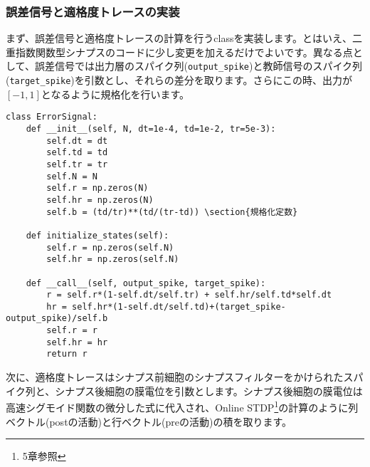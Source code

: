 \subsubsection{誤差信号と適格度トレースの実装}
まず、誤差信号と適格度トレースの計算を行うclassを実装します。とはいえ、二重指数関数型シナプスのコードに少し変更を加えるだけでよいです。異なる点として、誤差信号では出力層のスパイク列(\texttt{output\_spike})と教師信号のスパイク列(\texttt{target\_spike})を引数とし、それらの差分を取ります。さらにこの時、出力が$[-1, 1]$となるように規格化を行います。
\begin{verbatim}
class ErrorSignal:
    def __init__(self, N, dt=1e-4, td=1e-2, tr=5e-3):
        self.dt = dt
        self.td = td
        self.tr = tr
        self.N = N
        self.r = np.zeros(N)
        self.hr = np.zeros(N)
        self.b = (td/tr)**(td/(tr-td)) \section{規格化定数}
    
    def initialize_states(self):
        self.r = np.zeros(self.N)
        self.hr = np.zeros(self.N)    

    def __call__(self, output_spike, target_spike):
        r = self.r*(1-self.dt/self.tr) + self.hr/self.td*self.dt 
        hr = self.hr*(1-self.dt/self.td)+(target_spike-output_spike)/self.b
        self.r = r
        self.hr = hr
        return r
\end{verbatim}
次に、適格度トレースはシナプス前細胞のシナプスフィルターをかけられたスパイク列と、シナプス後細胞の膜電位を引数とします。シナプス後細胞の膜電位は高速シグモイド関数の微分した式に代入され、Online STDP\footnote{5章参照}の計算のように列ベクトル(postの活動)と行ベクトル(preの活動)の積を取ります。
